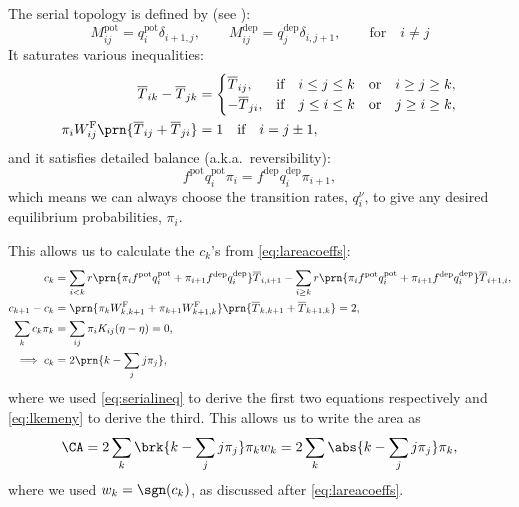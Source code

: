\documentclass[12pt]{article}
\newcommand{\eqm}{\pi}
\newcommand{\fptm}{T}
\newcommand{\fptbm}{\overline{\fptm}}
\newcommand{\wm}{w}
\newcommand{\w}{\mathbf{\wm}}
\newcommand{\Wm}{W}
\newcommand{\MMdm}{M}
\newcommand{\encm}{K}
\newcommand{\frgm}{\Wm^{\mathrm{F}}}
\newcommand{\pot}{^{\text{pot}}}
\newcommand{\dep}{^{\text{dep}}}
\begin{document}
The serial topology is defined by (see \cite{Leibold2008serial,Ben-DayanRubin2007sparse}):
%
\begin{equation}\label{eq:serialdef}
  \MMdm\pot_{ij} = q\pot_i \delta_{i+1,j},
  \qquad
  \MMdm\dep_{ij} = q\dep_j \delta_{i,j+1},
  \qquad \text{for}\quad i \neq j
\end{equation}
%
It saturates various inequalities:
%
\begin{equation}\label{eq:serialineq}
  \begin{aligned}
    \fptbm_{ik} - \fptbm_{jk} &=
      \begin{cases}
        \fptbm_{ij},  &\text{if}\quad i \leq j \leq k \quad\text{or}\quad i \geq j \geq k,\\
        -\fptbm_{ji}, &\text{if}\quad j \leq i \leq k \quad\text{or}\quad j \geq i \geq k,\\
      \end{cases} \\
    \eqm_i \frgm_{ij} \prn{\fptbm_{ij}+\fptbm_{ji}} &= 1 \quad\text{if}\quad i=j\pm1,
  \end{aligned}
\end{equation}
%
and it satisfies detailed balance (a.k.a.\ reversibility):
%
\begin{equation}\label{eq:multistateprob}
  f\pot q\pot_i \eqm_i = f\dep q\dep_i \eqm_{i+1},
\end{equation}
%
which means we can always choose the transition rates, $q^\nu_i$, to give any desired equilibrium probabilities, $\eqm_i$.

This allows us to calculate the $c_k$'s from \cref{eq:lareacoeffs}:
%
\begin{equation}\label{eq:serialareacoeff}
\begin{aligned}
  c_k &= \sum_{i<k} r\prn{\eqm_{i} f\pot q\pot_i + \eqm_{i+1} f\dep q\dep_i} \fptbm_{i,i+1}
    - \sum_{i\geq k} r\prn{\eqm_{i} f\pot q\pot_i + \eqm_{i+1} f\dep q\dep_i} \fptbm_{i+1,i}
  ,\\
  c_{k+1} - c_k &= \prn{\eqm_{k} \frgm_{k,k+1} + \eqm_{k+1} \frgm_{k+1,k}}
                    \prn{\fptbm_{k,k+1} + \fptbm_{k+1,k}}
    = 2,\\
  \sum_k c_k \eqm_k &= \sum_{ij} \eqm_i \encm_{ij} (\eta-\eta) = 0,\\
  \implies c_k &= 2 \prn{k - \sum_j j\eqm_j},
\end{aligned}
\end{equation}
%
where we used \cref{eq:serialineq} to derive the first two equations respectively and \cref{eq:lkemeny} to derive the third. 
This allows us to write the area as
%
\begin{equation}\label{eq:serialarea}
  \CA = {2} \sum_k \brk{k - \sum_j j\eqm_j} \eqm_k \wm_k
    = {2} \sum_k \abs{k - \sum_j j\eqm_j} \eqm_k ,
\end{equation}
%
where we used $\wm_k=\sgn(c_k)$, as discussed after \cref{eq:lareacoeffs}.
\end{document}
